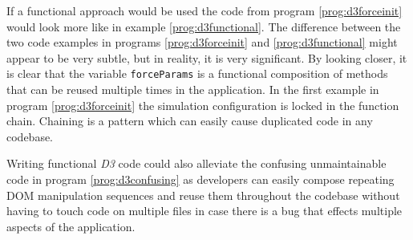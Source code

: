 If a functional approach would be used the code from program \ref{prog:d3forceinit} would look more like in example \ref{prog:d3functional}. The difference between the two code examples in programs \ref{prog:d3forceinit} and \ref{prog:d3functional} might appear to be very subtle, but in reality, it is very significant. By looking closer, it is clear that the variable \texttt{forceParams} is a functional composition of methods that can be reused multiple times in the application. In the first example in program \ref{prog:d3forceinit} the simulation configuration is locked in the function chain. Chaining is a pattern which can easily cause duplicated code in any codebase. 

Writing functional \emph{D3} code could also alleviate the confusing unmaintainable code in program \ref{prog:d3confusing} as developers can easily compose repeating DOM manipulation sequences and reuse them throughout the codebase without having to touch code on multiple files in case there is a bug that effects multiple aspects of the application.
